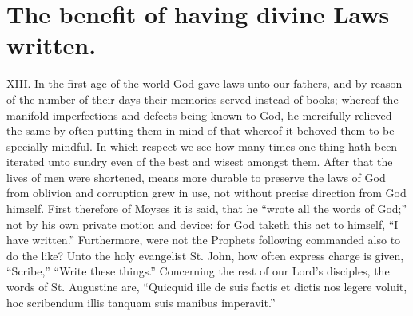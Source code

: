 \section*{The benefit of having divine Laws written.}

XIII. In the first age of the world God gave laws unto our fathers, and by reason of the number of their days their memories served instead of books; whereof the manifold imperfections and defects being known to God, he mercifully relieved the same by often putting them in mind of that whereof it behoved them to be specially mindful. In which respect we see how many times one thing hath been iterated unto sundry even of the best and wisest amongst them. After  that the lives of men were shortened, means more durable to preserve the laws of God from oblivion and corruption grew in use, not without precise direction from God himself. First therefore of Moyses it is said, that he “wrote all the words of God;” not by his own private motion and device: for God taketh this act to himself, “I have written.” Furthermore, were not the Prophets following commanded also to do the like? Unto the holy evangelist St. John, how often express charge is given, “Scribe,” “Write these things.” Concerning the rest of our Lord’s disciples, the words of St. Augustine are, “Quicquid ille de suis factis et dictis nos legere voluit, hoc scribendum illis tanquam suis manibus imperavit.”


